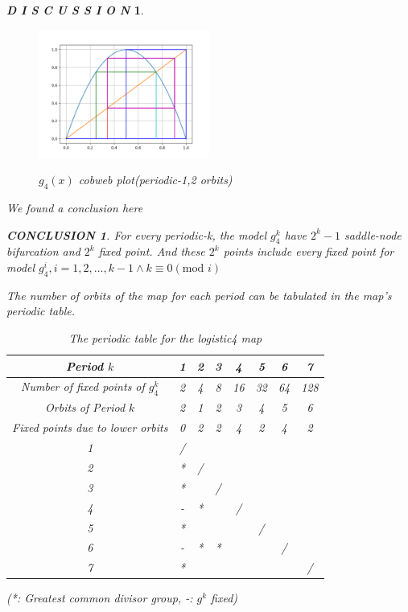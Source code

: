 \documentclass[12pt]{article}
\theoremstyle{plain}
\newtheorem{discussion}{\textit{D I S C U S S I O N}}[section]
\newtheorem{conclusion}{\textit{\textbf{CONCLUSION}}}[section]
\begin{document}
\begin{discussion}
\begin{figure}[H]
\begin{center}
\includegraphics[width=0.5\textwidth]{figure/section1/4-logistic-cobweb-plot.png}\\
\caption{$g_4(x)$ cobweb plot(periodic-1,2 orbits)}\label{4-logistic-ite}
\end{center}
\end{figure}

\newpage
We found a conclusion here
\begin{conclusion}
For every periodic-k, the model $g_4^k$ have $2^{k} - 1$ saddle-node bifurcation and $2^k$ fixed point. And these $2^k$ points include every fixed point for model $g_4^{i}, i = 1, 2, \ldots, k-1 \land k \equiv 0 (\text{mod } i)$
\end{conclusion}

The number of orbits of the map for each period can be tabulated in the map's periodic table.



\begin{table}[H]
\centering  
\caption{The periodic table for the logistic4 map}  
\begin{tabular}{|c||c|c|c|c|c|c|c|}
\hline
Period $k$                             & 1 & 2 & 3 & 4  & 5  & 6  & 7   \\
\hline
\hline
Number of fixed points of $g_4^k$      & 2 & 4 & 8 & 16 & 32 & 64 & 128 \\
\hline
Orbits of Period $k$                   & 2 & 1 & 2 & 3  & 4  & 5  & 6   \\
\hline
Fixed points due to lower orbits       & 0 & 2 & 2 & 4  & 2  & 4  & 2   \\
\hline
\hline
1                                      & / &   &   &    &    &    &   \\
2                                      & * & / &   &    &    &    &   \\
3                                      & * &   & / &    &    &    &   \\
4                                      & - & * &   & /  &    &    &   \\
5                                      & * &   &   &    & /  &    &   \\
6                                      & - & * & * &    &    & /  &   \\
7                                      & * &   &   &    &    &    & / \\
\hline
\end{tabular}  
\end{table}
(*: Greatest common divisor group, -: $g^k$ fixed)
\end{discussion}
\end{document}
